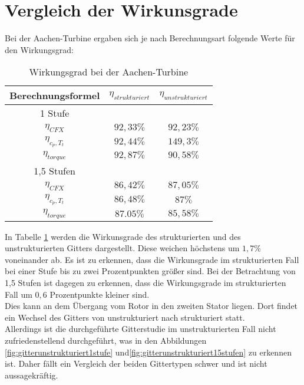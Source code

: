 \section{Vergleich der Wirkunsgrade}
Bei der Aachen-Turbine ergaben sich je nach Berechnungsart folgende Werte für den Wirkungsgrad:
\begin{table}[H]
	\centering
	\caption{Wirkungsgrad bei der Aachen-Turbine}
	\begin{tabular}{ c| c | c}
Berechnungsformel	&	$\eta_{strukturiert}$	&	$\eta_{unstrukturiert}$	\\
\hline
1 Stufe	&		&		\\
\hline
$\eta_{CFX}$	&	$92,33\%$	&	$92,23\%$	\\
$\eta_{c_p, T_t}$	&	$92,44\%$	&	$149,3\%$	\\
$\eta_{torque}$	&	$92,87\%$	&	$90,58\%$	\\
\hline
1,5 Stufen 	&		&		\\
\hline
$\eta_{CFX}$	&	$86,42\%$	&	$87,05\%$	\\
$\eta_{c_p, T_t}$	&	$86,48\%$	&	$87\%$	\\
$\eta_{torque}$	&	$87.05\%$	&	$85,58\%$	\\

	\end{tabular}
	\label{tab:wgaachen}
\end{table}
In Tabelle \ref{tab:wgaachen} werden die Wirkunsgrade des strukturierten und des unstrukturierten Gitters dargestellt. Diese weichen höchstens um $1,7\%$ voneinander ab. Es ist zu erkennen, dass die Wirkunsgrade im strukturierten Fall bei einer Stufe bis zu zwei Prozentpunkten größer sind. Bei der Betrachtung von 1,5 Stufen ist dagegen zu erkennen, dass die Wirkungsgrade im strukturierten Fall um $0,6$ Prozentpunkte kleiner sind.\\
Dies kann an dem Übergang vom Rotor in den zweiten Stator liegen. Dort findet ein Wechsel des Gitters von unstrukturiert nach strukturiert statt.\\
Allerdings ist die durchgeführte Gitterstudie im unstrukturierten Fall nicht zufriedenstellend durchgeführt, was in den Abbildungen \ref{fig:gitterunstrukturiert1stufe} und\ref{fig:gitterunstrukturiert15stufen} zu erkennen ist. Daher fällt ein Vergleich der beiden Gittertypen schwer und ist nicht aussagekräftig. \\ 

